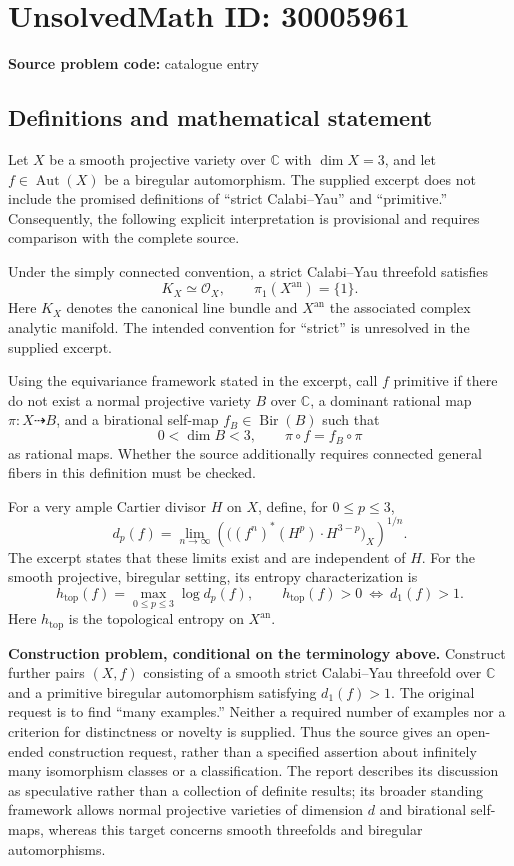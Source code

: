 \documentclass[11pt]{article}
\newcommand{\C}{\mathbb{C}}
\begin{document}
\section*{UnsolvedMath ID: 30005961}
\textbf{Source problem code:} catalogue entry
\subsection{Definitions and mathematical statement}
Let \(X\) be a smooth projective variety over \(\C\) with \(\dim X=3\), and let \(f\in\operatorname{Aut}(X)\) be a biregular automorphism. The supplied excerpt does not include the promised definitions of ``strict Calabi--Yau'' and ``primitive.'' Consequently, the following explicit interpretation is provisional and requires comparison with the complete source.

Under the simply connected convention, a strict Calabi--Yau threefold satisfies
\[
K_X\simeq\mathcal O_X,
\qquad \pi_1(X^{\mathrm{an}})=\{1\}.
\]
Here \(K_X\) denotes the canonical line bundle and \(X^{\mathrm{an}}\) the associated complex analytic manifold. The intended convention for ``strict'' is unresolved in the supplied excerpt.

Using the equivariance framework stated in the excerpt, call \(f\) primitive if there do not exist a normal projective variety \(B\) over \(\C\), a dominant rational map \(\pi\colon X\dashrightarrow B\), and a birational self-map \(f_B\in\operatorname{Bir}(B)\) such that
\[
0<\dim B<3,
\qquad \pi\circ f=f_B\circ\pi
\]
as rational maps. Whether the source additionally requires connected general fibers in this definition must be checked.

For a very ample Cartier divisor \(H\) on \(X\), define, for \(0\leq p\leq3\),
\[
d_p(f)=\lim_{n\to\infty}
\left(\bigl((f^n)^*(H^p)\cdot H^{3-p}\bigr)_X\right)^{1/n}.
\]
The excerpt states that these limits exist and are independent of \(H\). For the smooth projective, biregular setting, its entropy characterization is
\[
h_{\mathrm{top}}(f)=\max_{0\leq p\leq3}\log d_p(f),
\qquad h_{\mathrm{top}}(f)>0\ \Longleftrightarrow\ d_1(f)>1.
\]
Here \(h_{\mathrm{top}}\) is the topological entropy on \(X^{\mathrm{an}}\).

\textbf{Construction problem, conditional on the terminology above.} Construct further pairs \((X,f)\) consisting of a smooth strict Calabi--Yau threefold over \(\C\) and a primitive biregular automorphism satisfying \(d_1(f)>1\). The original request is to find ``many examples.'' Neither a required number of examples nor a criterion for distinctness or novelty is supplied. Thus the source gives an open-ended construction request, rather than a specified assertion about infinitely many isomorphism classes or a classification. The report describes its discussion as speculative rather than a collection of definite results; its broader standing framework allows normal projective varieties of dimension \(d\) and birational self-maps, whereas this target concerns smooth threefolds and biregular automorphisms.
\end{document}
